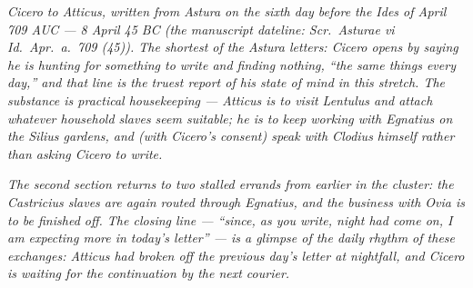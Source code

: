 
\textit{Cicero to Atticus, written from Astura on the
sixth day before the Ides of April 709 AUC ---
8 April 45 BC (the manuscript dateline:
\textit{Scr.\ Asturae vi Id.\ Apr.\ a.\ 709 (45)}). The
shortest of the Astura letters: Cicero opens by
saying he is hunting for something to write and
finding nothing, ``the same things every day,'' and
that line is the truest report of his state of mind
in this stretch. The substance is practical
housekeeping --- Atticus is to visit Lentulus and
attach whatever household slaves seem suitable; he
is to keep working with Egnatius on the Silius
gardens, and (with Cicero's consent) speak with
Clodius himself rather than asking Cicero to write.}

\textit{The second section returns to two stalled
errands from earlier in the cluster: the Castricius
slaves are again routed through Egnatius, and the
business with Ovia is to be finished off. The
closing line --- ``since, as you write, night had
come on, I am expecting more in today's letter'' ---
is a glimpse of the daily rhythm of these
exchanges: Atticus had broken off the previous
day's letter at nightfall, and Cicero is waiting for
the continuation by the next courier.}
